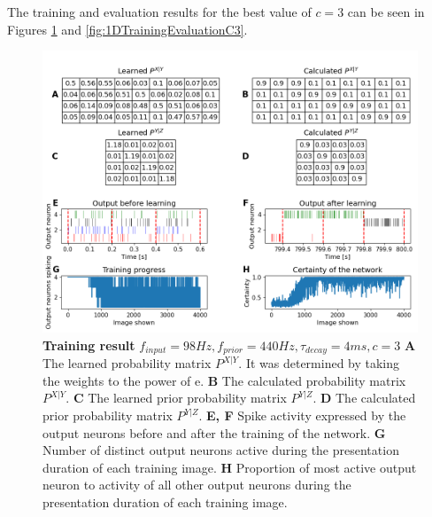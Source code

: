 The training and evaluation results for the best value of $c = 3$ can be seen in Figures \ref{fig:1DTrainingC3} and \ref{fig:1DTrainingEvaluationC3}.

\begin{figure}
  \includegraphics[width=\linewidth]{figures/1D/training/trainingPlot_98_440_4_c3.png}
  \caption{\textbf{Training result} $f_{input} = 98 Hz, f_{prior} = 440 Hz, \tau_{decay} = 4 ms, c = 3$ \textbf{A} The learned probability matrix $P^{X|Y}$. It was determined by taking the weights to the power of e. \textbf{B} The calculated probability matrix $P^{X|Y}$. \textbf{C} The learned prior probability matrix $P^{Y|Z}$. \textbf{D} The calculated prior probability matrix $P^{Y|Z}$. \textbf{E, F} Spike activity expressed by the output neurons before and after the training of the network. \textbf{G} Number of distinct output neurons active during the presentation duration of each training image. \textbf{H} Proportion of most active output neuron  to activity of all other output neurons during the presentation duration of each training image.}
  \label{fig:1DTrainingC3}
\end{figure}

